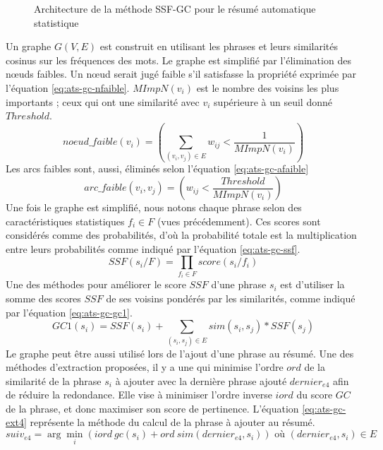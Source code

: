 \documentclass{KodeBook}
\begin{document}
\begin{figure}[!ht]
	\centering
	\caption[Architecture de la méthode SSF-GC (résumé automatique)]{Architecture de la méthode SSF-GC pour le résumé automatique statistique \cite{21-aries-al}}
	\label{fig:ats-gc}
\end{figure}

Un graphe $G(V, E)$ est construit en utilisant les phrases et leurs similarités cosinus sur les fréquences des mots.
Le graphe est simplifié par l'élimination des nœuds faibles. 
Un nœud serait jugé faible s'il satisfasse la propriété exprimée par l'équation \ref{eq:ats-gc-nfaible}.
$MImpN(v_i)$ est le nombre des voisins les plus importants ; ceux qui ont une similarité avec $v_i$ supérieure à un seuil donné $Threshold$.
\begin{equation}\label{eq:ats-gc-nfaible}
noeud\_faible(v_i) = ( \sum_{(v_i, v_j) \in E} w_{ij} < \frac{1}{MImpN(v_i)} )
\end{equation}
Les arcs faibles sont, aussi, éliminés selon l'équation \ref{eq:ats-gc-afaible}
\begin{equation}\label{eq:ats-gc-afaible}
arc\_faible(v_i, v_j) = ( w_{ij} < \frac{Threshold}{MImpN(v_i)})
\end{equation}
Une fois le graphe est simplifié, nous notons chaque phrase selon des caractéristiques statistiques $f_i \in F$ (vues précédemment). 
Ces scores sont considérés comme des probabilités, d'où la probabilité totale est la multiplication entre leurs probabilités comme indiqué par l'équation \ref{eq:ats-gc-ssf}.
\begin{equation}\label{eq:ats-gc-ssf}
SSF(s_i/ F) = \prod_{f_i \in F} score(s_i/f_i)
\end{equation}
Une des méthodes pour améliorer le score $SSF$ d'une phrase $s_i$ est d'utiliser la somme des scores $SSF$ de ses voisins pondérés par les similarités, comme indiqué par l'équation \ref{eq:ats-gc-gc1}.
\begin{equation}\label{eq:ats-gc-gc1}
GC1(s_i) = SSF(s_i) + \sum\limits_{(s_i, s_j) \in E} sim(s_i, s_j) * SSF(s_j)
\end{equation}
Le graphe peut être aussi utilisé lors de l'ajout d'une phrase au résumé. 
Une des méthodes d'extraction proposées, il y a une qui minimise l'ordre $ord$ de la similarité de la phrase $s_i$ à ajouter avec la dernière phrase ajouté $dernier_{e4}$ afin de réduire la redondance.
Elle vise à minimiser l'ordre inverse $iord$ du score $GC$ de la phrase, et donc maximiser son score de pertinence.
L'équation \ref{eq:ats-gc-ext4} représente la méthode du calcul de la phrase à ajouter au résumé.
\begin{equation}\label{eq:ats-gc-ext4}
suiv_{e4}  =  \arg\min\limits_i (iord\ gc(s_i) + ord\ sim(dernier_{e4}, s_i)) \text{ où } (dernier_{e4}, s_i) \in E
\end{equation}
\end{document}
